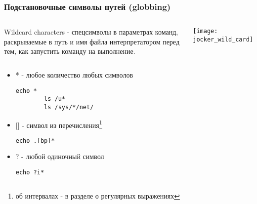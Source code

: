 \begin{frame}[fragile]
  \frametitle{Подстановочные символы путей (globbing)}
    \begin{columns}
  \alert{Wildcard characters} - спецсимволы в параметрах команд, раскрываемые в путь и имя файла интерпретатором перед тем, как запустить команду на выполнение. 

            \center\texttt{[image: jocker\_wild\_card]}
    \end{columns} 
  \begin{itemize}
    \item \alert{*} - любое количество любых символов
\begin{lstlisting}[basicstyle=\normalsize]
        echo *
        ls /u*
        ls /sys/*/net/
\end{lstlisting} \pause
    \item \alert{[]} - символ из перечисления\footnote{об интервалах - в разделе о регулярных выражениях}
\begin{lstlisting}[basicstyle=\normalsize]
        echo .[bp]*
\end{lstlisting} \pause
    \item \alert{?} - любой одиночный символ
\begin{lstlisting}[basicstyle=\normalsize]
        echo ?i*
\end{lstlisting} 
  \end{itemize}

\end{frame}

